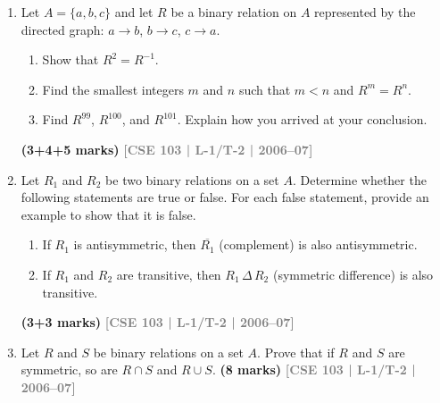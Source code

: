 \documentclass[12pt,a3paper]{article}
\newcommand{\yr}[1]{\hfill\textcolor{gray}{\small\textbf{[#1]}}}
\newcommand{\mk}[1]{\textcolor{orange!70!black}{\small\textbf{(#1 marks)}}}
\begin{document}
\begin{enumerate}
\mk{2+10} \yr{CSE 103 | L-1/T-2 | 2008--09}


\item Let $A = \{a, b, c\}$ and let $R$ be a binary relation on $A$ represented by the directed graph: $a \to b$, $b \to c$, $c \to a$.

\begin{center}
\end{center}
\begin{enumerate}
  \item Show that $R^2 = R^{-1}$.
  \item Find the smallest integers $m$ and $n$ such that $m < n$ and $R^m = R^n$.
  \item Find $R^{99}$, $R^{100}$, and $R^{101}$. Explain how you arrived at your conclusion.
\end{enumerate}
\mk{3+4+5} \yr{CSE 103 | L-1/T-2 | 2006--07}

\item Let $R_1$ and $R_2$ be two binary relations on a set $A$. Determine whether the following statements are true or false. For each false statement, provide an example to show that it is false.
\begin{enumerate}
  \item If $R_1$ is antisymmetric, then $\overline{R_1}$ (complement) is also antisymmetric.
  \item If $R_1$ and $R_2$ are transitive, then $R_1 \,\Delta\, R_2$ (symmetric difference) is also transitive.
\end{enumerate}
\mk{3+3} \yr{CSE 103 | L-1/T-2 | 2006--07}

\item Let $R$ and $S$ be binary relations on a set $A$. Prove that if $R$ and $S$ are symmetric, so are $R \cap S$ and $R \cup S$.
\mk{8} \yr{CSE 103 | L-1/T-2 | 2006--07}


\end{enumerate}
\end{document}
